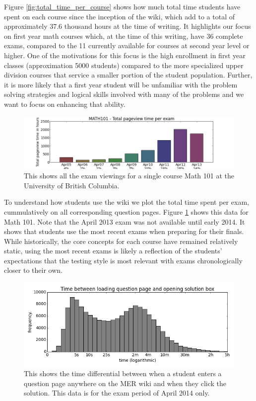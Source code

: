 \documentclass{primus}
\begin{document}
\noindent{}Figure \ref{fig:total_time_per_course} shows how much total time students have spent on each course since the inception of the wiki, which add to a total of approximately 37.6 thousand hours at the time of writing. It highlights our focus on first year math courses which, at the time of this writing, have 36 complete exams, compared to the 11 currently available for courses at second year level or higher.  One of the motivations for this focus is the high enrollment in first year classes (approximation 5000 students) compared to the more specialized upper division courses that service a smaller portion of the student population.  Further, it is more likely that a first year student will be unfamiliar with the problem solving strategies and logical skills involved with many of the problems and we want to focus on enhancing that ability.

\begin{figure}[H]
\centering
\includegraphics[width=\textwidth]{figs/total_pageview_per_exam_101.png}
\caption{This shows all the exam viewings for a single course Math 101 at the University of British Columbia.}\label{fig:total_pageview_per_exam_101}
\end{figure}

\noindent{}To understand how students use the wiki we plot the total time spent per exam, cummulatively on all corresponding question pages. Figure \ref{fig:total_pageview_per_exam_101} shows this data for Math 101. Note that the April 2013 exam was not available until early 2014. It shows that students use the most recent exams when preparing for their finals.  While historically, the core concepts for each course have remained relatively static, using the most recent exams is likely a reflection of the students’ expectations that the testing style is most relevant with exams chronologically closer to their own.

\begin{figure}[H]
\centering
\includegraphics[width=\textwidth]{figs/2013_Term2_delta_t.png}
\caption{This shows the time differential between when a student enters a question page anywhere on the MER wiki and when they click the solution.  This data is for the exam period of April 2014 only.}\label{fig:2013_Term2_delta_t}
\end{figure}
\end{document}
